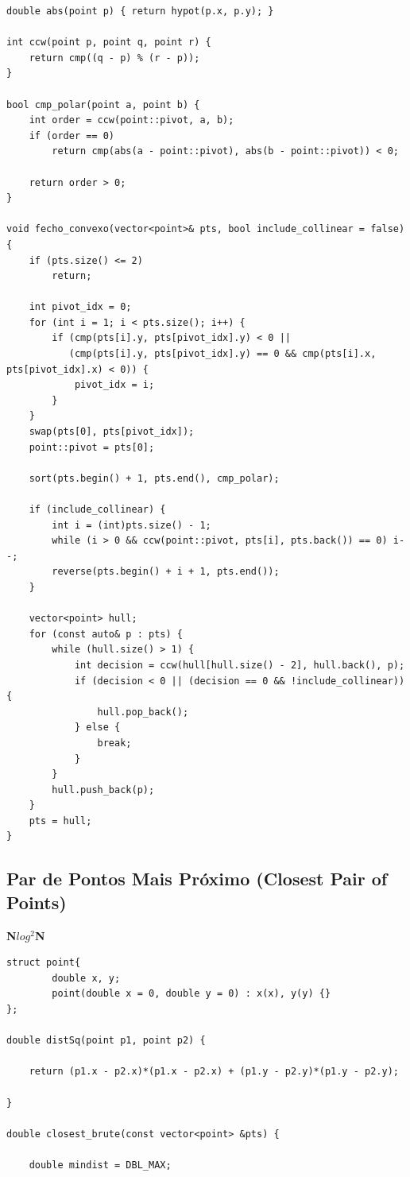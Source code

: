 \documentclass[11pt]{article}
\begin{document}
\begin{multicols}{2}
\begin{lstlisting}
double abs(point p) { return hypot(p.x, p.y); }

int ccw(point p, point q, point r) {
    return cmp((q - p) % (r - p));
}

bool cmp_polar(point a, point b) {
    int order = ccw(point::pivot, a, b);
    if (order == 0) 
        return cmp(abs(a - point::pivot), abs(b - point::pivot)) < 0;
    
    return order > 0;
}

void fecho_convexo(vector<point>& pts, bool include_collinear = false) {
    if (pts.size() <= 2) 
        return;
    
    int pivot_idx = 0;
    for (int i = 1; i < pts.size(); i++) {
        if (cmp(pts[i].y, pts[pivot_idx].y) < 0 || 
           (cmp(pts[i].y, pts[pivot_idx].y) == 0 && cmp(pts[i].x, pts[pivot_idx].x) < 0)) {
            pivot_idx = i;
        }
    }
    swap(pts[0], pts[pivot_idx]);
    point::pivot = pts[0];

    sort(pts.begin() + 1, pts.end(), cmp_polar);
    
    if (include_collinear) {
        int i = (int)pts.size() - 1;
        while (i > 0 && ccw(point::pivot, pts[i], pts.back()) == 0) i--;
        reverse(pts.begin() + i + 1, pts.end());
    }

    vector<point> hull;
    for (const auto& p : pts) {
        while (hull.size() > 1) {
            int decision = ccw(hull[hull.size() - 2], hull.back(), p);
            if (decision < 0 || (decision == 0 && !include_collinear)) {
                hull.pop_back();
            } else {
                break;
            }
        }
        hull.push_back(p);
    }
    pts = hull;
}
\end{lstlisting}

\subsection{Par de Pontos Mais Próximo (Closest Pair of Points)}
\textbf{N$log^2$N}
\begin{lstlisting}
struct point{
		double x, y;
		point(double x = 0, double y = 0) : x(x), y(y) {}
};

double distSq(point p1, point p2) {

	return (p1.x - p2.x)*(p1.x - p2.x) + (p1.y - p2.y)*(p1.y - p2.y);

}

double closest_brute(const vector<point> &pts) {

	double mindist = DBL_MAX;
	

\end{lstlisting}
\end{multicols}
\end{document}
